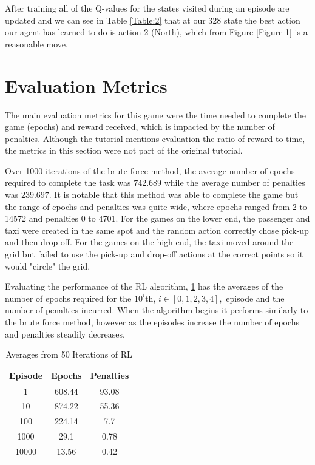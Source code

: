 \documentclass[10pt,twocolumn]{article}
\begin{document}
After training all of the Q-values for the states visited during an episode are updated and we can see in Table \ref{Table:2} that at our 328 state the best action our agent has learned to do is action 2 (North), which from Figure \ref{Figure 1} is a reasonable move.

\section{Evaluation Metrics}

The main evaluation metrics for this game were the time needed to complete the game (epochs) and reward received, which is impacted by the number of penalties.
Although the tutorial mentions evaluation the ratio of reward to time, the metrics in this section were not part of the original tutorial.

Over 1000 iterations of the brute force method, the average number of epochs required to complete the task was $742.689$ while the average number of penalties was $239.697$.
It is notable that this method was able to complete the game but the range of epochs and penalties was quite wide, where epochs ranged from 2 to 14572 and penalties 0 to 4701.
For the games on the lower end, the passenger and taxi were created in the same spot and the random action correctly chose pick-up and then drop-off.
For the games on the high end, the taxi moved around the grid but failed to use the pick-up and drop-off actions at the correct points so it would "circle" the grid.


Evaluating the performance of the RL algorithm, \ref{Table:3} has the averages of the number of epochs required for the $10^i$th, $i \in [0, 1, 2, 3, 4],$ episode and the number of penalties incurred.
When the algorithm begins it performs similarly to the brute force method, however as the episodes increase the number of epochs and penalties steadily decreases.

\begin{table}[ht]
    \vspace{1cm}
    \centering
    \caption{Averages from 50 Iterations of RL}
    \label{Table:3}
    \begin{tabular}{ || c c c || }
       \hline
       Episode & Epochs & Penalties  \\ \hline \hline
       1 & 608.44 & 93.08  \\ \hline
       10 & 874.22 & 55.36 \\ \hline
       100 & 224.14 & 7.7 \\ \hline
       1000 & 29.1 & 0.78 \\ \hline
       10000 & 13.56 & 0.42 \\ \hline
    \end{tabular}
\end{table}
\end{document}
